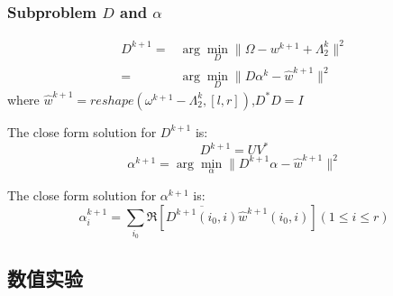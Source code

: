 \documentclass[UTF8]{beamer}
\begin{document}
\begin{frame}[c]\frametitle{Subproblem $D$ and $\alpha$ }
$$
\begin{aligned}
D^{k+1} =& \arg \min_{D} \| \Omega -  w^{k+1} + \Lambda_2^{k}\|^{2} \\
=& \arg \min_{D} \| D\alpha^k - \hat {w}^{k+1}\|^{2} 
\end{aligned}
$$
where $\hat {w}^{k+1} = reshape( \omega^{k+1} - \Lambda_2^{k},[l,r])$,$D^*D=I$

The close form solution for $D^{k+1}$ is:
\begin{equation}
D^{k+1} = UV^*
\label{Dup}
\end{equation}
$$
\alpha^{k+1} = \arg \min_{\alpha} \| D^{k+1}\alpha - \hat {w}^{k+1}\|^{2} 
$$

The close form solution for $\alpha^{k+1}$ is:
\begin{equation}
\label{alpha up}
\alpha_i^{k+1} =  \sum_{i_0} \Re[ \overline{D^{k+1}(i_0,i)} \hat {w}^{k+1}(i_0,i) ]
(1\leq i \leq r)
\end{equation}
\end{frame}

%

\subsection{数值实验}
\end{document}
